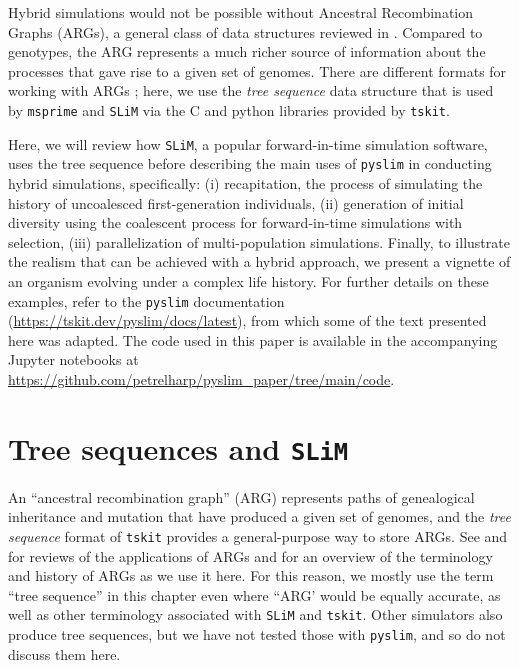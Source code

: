 \documentclass[12pt]{article}
\newcommand{\msprime}[0]{\texttt{msprime}\xspace}
\newcommand{\tskit}[0]{\texttt{tskit}\xspace}
\newcommand{\slim}[0]{\texttt{SLiM}\xspace}
\newcommand{\pyslim}[0]{\texttt{pyslim}\xspace}
\begin{document}

Hybrid simulations would not be possible without Ancestral Recombination Graphs (ARGs), 
a general class of data structures reviewed in \citet{wong_general_2024}.
Compared to genotypes,
the ARG represents a much richer source of information about the processes that gave rise to a given set of genomes.
There are different formats for working with ARGs \citep{palamara2016argon,dehaas2024enabling,parida2011minimal,gunnarsson2024scalable};
here, we use the \emph{tree sequence} data structure \citep{kelleher_efficient_2016,ralph_efficiently_2020}
that is used by \msprime and \slim via the C and python libraries provided by \tskit.

Here, we will review how \slim, a popular forward-in-time simulation software, uses the tree sequence before describing
the main uses of \pyslim in conducting hybrid simulations, specifically:
(i) recapitation, the process of simulating the history of uncoalesced first-generation individuals,
(ii) generation of initial diversity using the coalescent process for forward-in-time simulations with selection,
(iii) parallelization of multi-population simulations.
Finally, to illustrate the realism that can be achieved with a hybrid approach, we present a vignette of an organism evolving under a complex life history.
For further details on these examples, refer to the \pyslim{} documentation (\url{https://tskit.dev/pyslim/docs/latest}), from which some of the text presented here was adapted.
The code used in this paper is available in the accompanying Jupyter notebooks at \url{https://github.com/petrelharp/pyslim_paper/tree/main/code}.

\section{Tree sequences and \slim}
An ``ancestral recombination graph'' (ARG)
represents paths of genealogical inheritance and mutation that have produced a given set of genomes,
and the \emph{tree sequence} format of \tskit provides a general-purpose way to store ARGs.
See \cite{lewanski2024introduction} and \citet{brandt2022evaluation} for reviews of the applications of ARGs
and \citet{wong_general_2024} for an overview of the terminology and history of ARGs as we use it here.
For this reason, we mostly use the term ``tree sequence'' in this chapter even where ``ARG'
would be equally accurate, as well as other terminology associated with \slim and \tskit \citep{kelleher_efficient_2016,ralph_efficiently_2020,wong_general_2024}.
Other simulators also produce tree sequences,
but we have not tested those with \pyslim, and so do not discuss them here.
\end{document}
